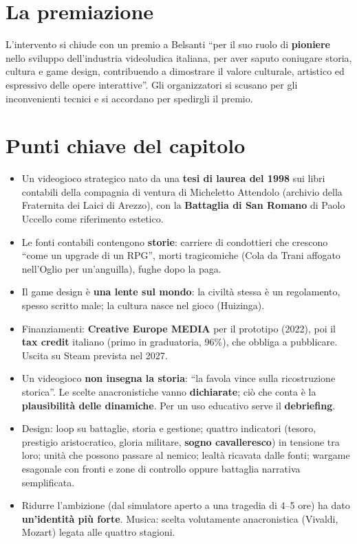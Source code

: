 \section{La premiazione}
\label{sec:c1-2-premio}

L'intervento si chiude con un premio a Belsanti ``per il suo ruolo di
\textbf{pioniere} nello sviluppo dell'industria videoludica italiana, per aver
saputo coniugare storia, cultura e game design, contribuendo a dimostrare il
valore culturale, artistico ed espressivo delle opere interattive''. Gli
organizzatori si scusano per gli inconvenienti tecnici e si accordano per
spedirgli il premio.

\section*{Punti chiave del capitolo}

\begin{itemize}
  \item Un videogioco strategico nato da una \textbf{tesi di laurea del 1998}
        sui libri contabili della compagnia di ventura di Micheletto Attendolo
        (archivio della Fraternita dei Laici di Arezzo), con la
        \textbf{Battaglia di San Romano} di Paolo Uccello come riferimento
        estetico.
  \item Le fonti contabili contengono \textbf{storie}: carriere di condottieri
        che crescono ``come un upgrade di un RPG'', morti tragicomiche (Cola da
        Trani affogato nell'Oglio per un'anguilla), fughe dopo la paga.
  \item Il game design è \textbf{una lente sul mondo}: la civiltà stessa è un
        regolamento, spesso scritto male; la cultura nasce nel gioco
        (Huizinga).
  \item Finanziamenti: \textbf{Creative Europe MEDIA} per il prototipo (2022),
        poi il \textbf{tax credit} italiano (primo in graduatoria, 96\%), che
        obbliga a pubblicare. Uscita su Steam prevista nel 2027.
  \item Un videogioco \textbf{non insegna la storia}: ``la favola vince sulla
        ricostruzione storica''. Le scelte anacronistiche vanno
        \textbf{dichiarate}; ciò che conta è la \textbf{plausibilità delle
        dinamiche}. Per un uso educativo serve il \textbf{debriefing}.
  \item Design: loop su battaglie, storia e gestione; quattro indicatori
        (tesoro, prestigio aristocratico, gloria militare, \textbf{sogno
        cavalleresco}) in tensione tra loro; unità che possono passare al
        nemico; lealtà ricavata dalle fonti; wargame esagonale con fronti e
        zone di controllo oppure battaglia narrativa semplificata.
  \item Ridurre l'ambizione (dal simulatore aperto a una tragedia di 4--5 ore)
        ha dato \textbf{un'identità più forte}. Musica: scelta volutamente
        anacronistica (Vivaldi, Mozart) legata alle quattro stagioni.
\end{itemize}
